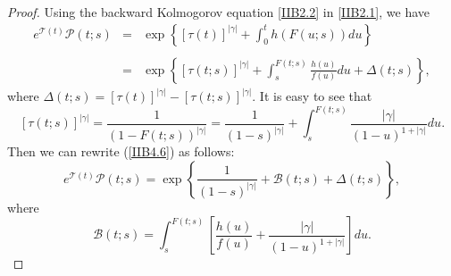 \documentclass[10pt,a4paper]{amsart}
\begin{document}
\begin{proof}
    Using the backward Kolmogorov equation {\eqref{IIB2.2}} in {\eqref{IIB2.1}}, we have
\begin{eqnarray}                              \label{IIB4.6}
    {{{e}^{\mathcal{T}(t)}}\mathcal{P}(t;s)}
& = & \exp\left\{{{\left[\tau(t)\right]}^{|\gamma|}}+\int_{0}^{t}{h\left(F(u;s)\right)du}\right\} \nonumber\\
\ \nonumber\\
& = & \exp \left\{{{\left[\tau(t;s)\right]}^{|\gamma|}}+\int_{s}^{F(t;s)}{\frac{h(u)}{f(u)}du}+\Delta(t;s)\right\},
\end{eqnarray}
    where $\Delta(t;s)={{[\tau(t)]}^{|\gamma|}}-{{[\tau(t;s)]}^{|\gamma|}}$. It is easy to see that
\[
    {{\left[\tau(t;s)\right]}^{|\gamma|}}=\frac{1}{{\left( 1-F(t;s) \right)}^{|\gamma|}}
    =\frac{1}{{(1-s)}^{|\gamma|}}+\int_{s}^{F(t;s)}{\frac{|\gamma|}{{(1-u)}^{1+|\gamma|}}du}.
\]
    Then we can rewrite {(\ref{IIB4.6})} as follows:
\begin{equation}                \label{IIB4.7}
    {{e}^{\mathcal{T}(t)}}\mathcal{P}(t;s)=\exp\left\{\frac{1}{{(1-s)}^{|\gamma|}}+\mathcal{B}(t;s)+\Delta (t;s)\right\},
\end{equation}
    where
\[
    \mathcal{B}(t;s)=\int_{s}^{F(t;s)}{\left[\frac{h(u)}{f(u)}+\frac{|\gamma|}{{(1-u)}^{1+|\gamma|}}\right]du}.
\]


\end{proof}
\end{document}
